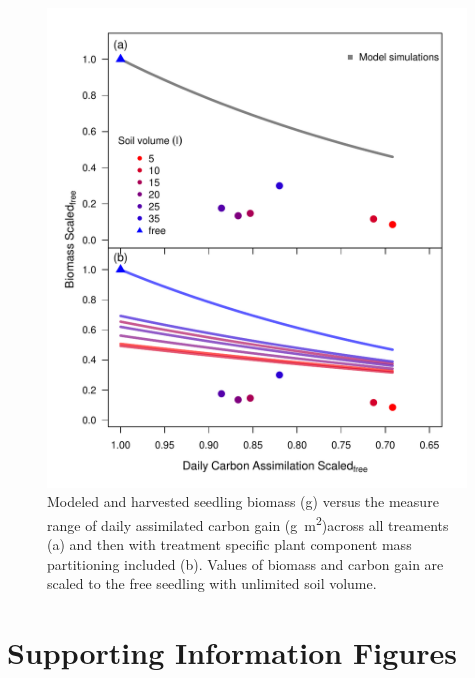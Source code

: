\documentclass[a4paper]{article}\usepackage[]{graphicx}\usepackage[]{color}
\begin{document}
\begin{figure}[h!]
    \centering
    \includegraphics[width=0.99\textwidth]{gC_day.pdf}
    \caption{Modeled and harvested seedling biomass (g) versus the measure range of daily assimilated carbon gain (g~m\textsuperscript{2})across all treaments (a) and then with treatment specific plant component mass partitioning included (b).  Values of biomass and carbon gain are scaled to the free seedling with unlimited soil volume.}
    \label{fig:figure6}
\end{figure}

\clearpage
\section{Supporting Information Figures}

\renewcommand\thefigure{S\arabic{figure}}    
\setcounter{figure}{0}   
\end{document}

